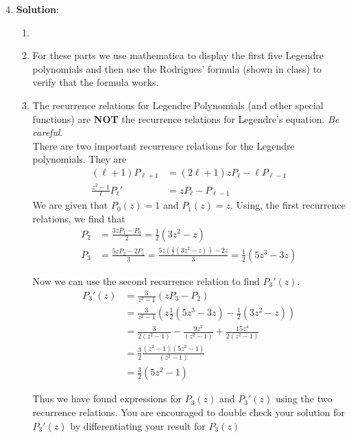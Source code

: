 \documentclass[usletter, 12pt]{article}
\begin{document}
\begin{enumerate}[leftmargin=0em, label=\textbf{\arabic*}.]
  \setcounter{enumi}{3} %
  \item \textbf{Solution}:\\
    \begin{enumerate}[leftmargin=2em, label=(\textbf{\alph*})]
    \item
    \item For these parts we use mathematica to display the first five Legendre
      polynomials and then use the Rodrigues' formula (shown in class) to verify
      that the formula works. 
      

    \item The recurrence relations for Legendre Polynomials (and other
      special functions) are \textbf{NOT} the recurrence relations for
      Legendre's equation. \textit{Be careful}.\\

      There are two important recurrence relations for the Legendre polynomials.
      They are
      \begin{align}
        (\ell+1)P_{\ell+1} &= (2\ell+1)zP_\ell-\ell P_{\ell-1} \\
        \frac{z^2-1}{\ell}P_\ell' &= zP_\ell - P_{\ell-1}
      \end{align}
      We are given that $P_0(z)=1$ and $P_1(z)=z$. Using, the first recurrence
      relations, we find that
      \begin{align}
        P_2 &= \frac{3zP_1-P_0}{2} = \frac{1}{2}(3z^2-z) \\
        P_3 &= \frac{5zP_2-2P_1}{3} = \frac{5z\left( \frac{1}{2}(3z^2-z) \right)-2z}{3} = \frac{1}{2}\left( 5z^3-3z \right)
      \end{align}

      Now we can use the second recurrence relation to find $P_3'(z)$.
      \begin{align}
        P_3'(z) &= \frac{3}{z^2-1}\left( zP_3-P_2 \right) \\
                &=\frac{3}{z^2-1}\left(z \frac{1}{2}\left( 5z^3-3z \right) -  \frac{1}{2}(3z^2-z) \right) \\
                &= \frac{3}{2(z^2-1)}-\frac{9z^2}{(z^2-1)}+\frac{15z^4}{2(z^2-1)}\\
                &= \frac{3}{2}\frac{(z^2-1)(5z^2-1)}{(z^2-1)} \\ 
                &= \frac{3}{2}\left( 5z^2-1 \right)
      \end{align}

      Thus we have found expressions for $P_3(z)$ and $P_3'(z)$ using the two
      recurrence relations. You are encouraged to double check your solution for
      $P_3'(z)$ by differentiating your result for $P_3(z)$
    \end{enumerate}
    
\end{enumerate}
\end{document}

